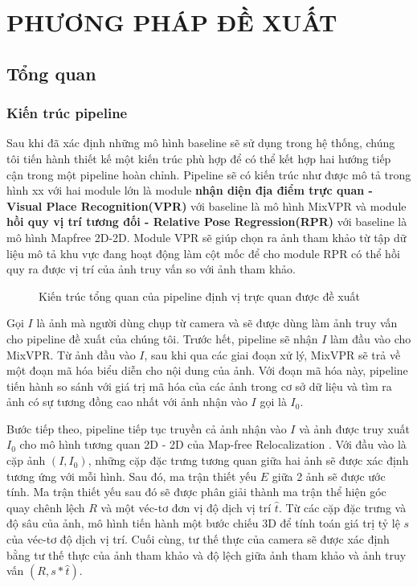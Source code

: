 \chapter{PHƯƠNG PHÁP ĐỀ XUẤT}

\section{Tổng quan}
\subsection{Kiến trúc pipeline}
Sau khi đã xác định những mô hình baseline sẽ sử dụng trong hệ thống, chúng tôi tiến hành thiết kế một kiến trúc phù hợp để có thể kết hợp hai hướng tiếp cận trong một pipeline hoàn chỉnh. Pipeline sẽ có kiến trúc như được mô tả trong hình xx với hai module lớn là module \textbf{nhận diện địa điểm trực quan - Visual Place Recognition(VPR)} với baseline là mô hình MixVPR và module \textbf{hồi quy vị trí tương đối - Relative Pose Regression(RPR)} với baseline là mô hình Mapfree 2D-2D. Module VPR sẽ giúp chọn ra ảnh tham khảo từ tập dữ liệu mô tả khu vực đang hoạt động làm cột mốc để cho module RPR có thể hồi quy ra được vị trí của ảnh truy vấn so với ảnh tham khảo.

\begin{figure}[htbp]
  \centering
  
  \caption{Kiến trúc tổng quan của pipeline định vị trực quan được đề xuất}
\end{figure}

Gọi $I$ là ảnh mà người dùng chụp từ camera và sẽ được dùng làm ảnh truy vấn cho pipeline đề xuất của chúng tôi. Trước hết, pipeline sẽ nhận $I$ làm đầu vào cho MixVPR. Từ ảnh đầu vào $I$, sau khi qua các giai đoạn xử lý, MixVPR sẽ trả về một đoạn mã hóa biểu diễn cho nội dung của ảnh. Với đoạn mã hóa này, pipeline tiến hành so sánh với giá trị mã hóa của các ảnh trong cơ sở dữ liệu và tìm ra ảnh có sự tương đồng cao nhất với ảnh nhận vào $I$ gọi là $I_0$.

Bước tiếp theo, pipeline tiếp tục truyền cả ảnh nhận vào $I$ và ảnh được truy xuất $I_0$ cho mô hình tương quan 2D - 2D của Map-free Relocalization \cite{arnold2022mapfree}. Với đầu vào là cặp ảnh $(I, I_0)$, những cặp đặc trưng tương quan giữa hai ảnh sẽ được xác định tương ứng với mỗi hình. Sau đó, ma trận thiết yếu $E$ giữa 2 ảnh sẽ được ước tính. Ma trận thiết yếu sau đó sẽ được phân giải thành ma trận thể hiện góc quay chênh lệch $R$ và một véc-tơ đơn vị độ dịch vị trí $\hat{t}$. Từ các cặp đặc trưng và độ sâu của ảnh, mô hình tiến hành một bước chiếu 3D để tính toán giá trị tỷ lệ $s$ của véc-tơ độ dịch vị trí. Cuối cùng, tư thế thực của camera sẽ được xác định bằng tư thế thực của ảnh tham khảo và độ lệch giữa ảnh tham khảo và ảnh truy vấn $(R,s*\hat{t})$.

